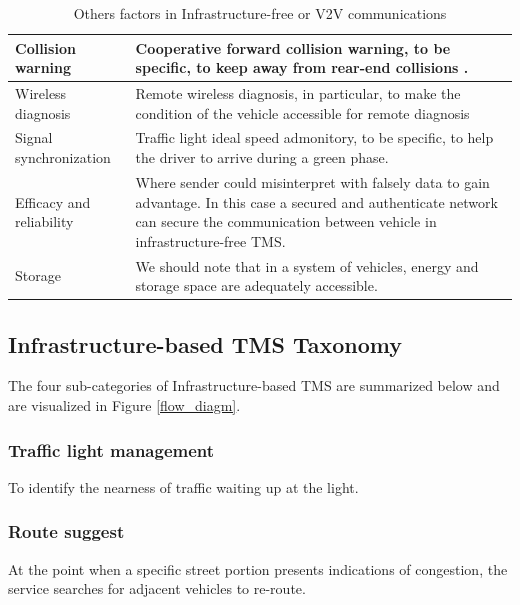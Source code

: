 \documentclass[conference]{IEEEtran}
\begin{document}
{
\tabulinesep=1mm
\begin{table}[!htb]
  \centering
  \begin{tabu} to 0.5\textwidth {|X[2,r]|X[6]|}
     \hline
      Collision warning&Cooperative forward collision warning, 
to be specific, to keep away from rear-end collisions \cite{adHocNetworks:Hartenstein}.\\\hline
      
      Wireless diagnosis &  Remote wireless diagnosis, in particular, to make the condition of the vehicle accessible for remote diagnosis\\\hline
      
     Signal synchronization & Traffic light ideal speed admonitory, to be specific, to help the driver to arrive during a green phase.\\\hline
     
     Efficacy and reliability & Where sender could misinterpret with falsely data to gain advantage. In this case a secured and authenticate network can secure the communication between vehicle in infrastructure-free TMS. \\\hline    
     Storage& We should note that in a system of vehicles, energy and storage space are adequately accessible. \\\hline
      
      
  \end{tabu}
  \smallskip
  \caption{Others factors in Infrastructure-free or V2V communications}
  \label{tab:V2Vmet}
\end{table}
}

\subsection{Infrastructure-based TMS Taxonomy}
The four sub-categories of Infrastructure-based TMS are summarized below and are visualized in Figure \ref{flow_diagm}.

\subsubsection{Traffic light management}
To identify the nearness of traffic waiting up at the light.
\subsubsection{Route suggest}
At the point when a specific street portion presents indications of congestion, the service searches for adjacent vehicles to re-route.
\end{document}
